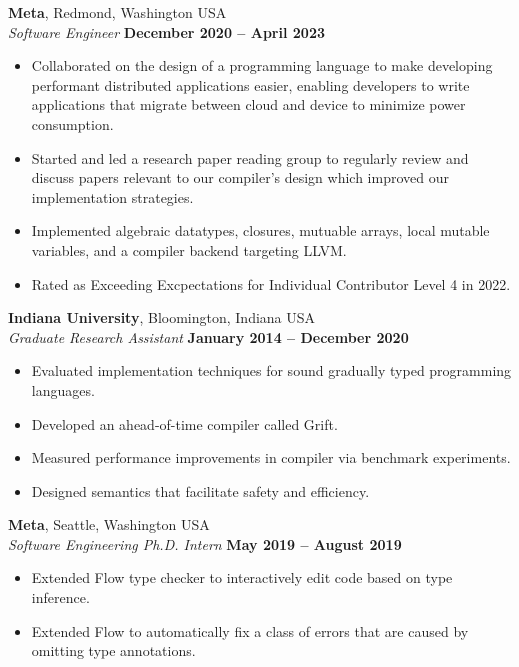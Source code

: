 \documentclass[resmargin,line]{res}
\begin{document}
\begin{resume}
{\bf Meta}, Redmond, Washington USA\\
{\em Software Engineer} \hfill {\bf December 2020 -- April 2023}\\
\begin{itemize}
\vspace*{-.3cm}
\item Collaborated on the design of a programming language to make developing performant distributed applications easier,
  enabling developers to write applications that migrate between cloud and device to minimize power consumption.
\item Started and led a research paper reading group to regularly review and discuss papers relevant to our compiler's design
  which improved our implementation strategies.
\item Implemented algebraic datatypes, closures, mutuable arrays, local mutable variables, and a compiler backend targeting LLVM.
\item Rated as Exceeding Excpectations for Individual Contributor Level 4 in 2022.
\end{itemize}

{\bf Indiana University}, Bloomington, Indiana USA\\
{\em Graduate Research Assistant} \hfill {\bf January 2014 -- December 2020}\\
%
\begin{itemize}
\vspace*{-.3cm}
\item Evaluated implementation techniques for sound gradually typed
  programming languages.
\item Developed an ahead-of-time compiler called Grift.
\item Measured performance improvements in compiler via benchmark experiments.
\item Designed semantics that facilitate safety and efficiency.
\end{itemize}

{\bf Meta}, Seattle, Washington USA\\
{\em Software Engineering Ph.D. Intern} \hfill {\bf May 2019 -- August 2019}\\
%
\begin{itemize}
\vspace*{-.3cm}
\item Extended Flow type checker to interactively edit code based on type inference.
\item Extended Flow to automatically fix a class of errors that are caused by omitting
  type annotations.
\end{itemize}


\end{resume}
\end{document}

